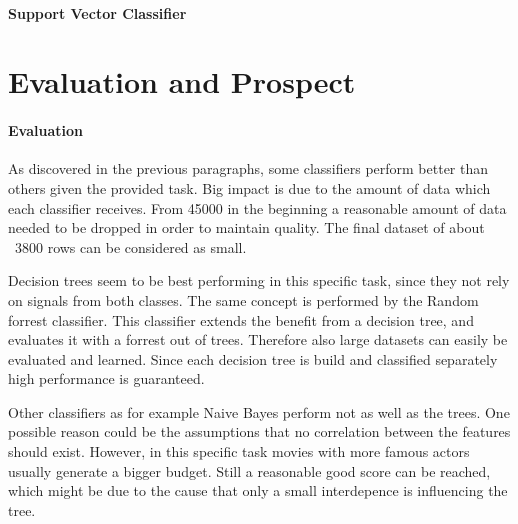 \paragraph{Support Vector Classifier}
\section{Evaluation and Prospect}
\paragraph{Evaluation}
As discovered in the previous paragraphs, some classifiers perform better than others given the provided task. Big impact is due to the amount of data which each classifier receives. From 45000 in the beginning a reasonable amount of data needed to be dropped in order to maintain quality. The final dataset of about ~3800 rows can be considered as small. 

Decision trees seem to be best performing in this specific task, since they not rely on signals from both classes. The same concept is performed by the Random forrest classifier. This classifier extends the benefit from a decision tree, and evaluates it with a forrest out of trees. Therefore also large datasets can easily be evaluated and learned. Since each decision tree is build and classified separately high performance is guaranteed.

Other classifiers as for example Naive Bayes perform not as well as the trees. One possible reason could be the assumptions that no correlation between the features should exist. However, in this specific task movies with more famous actors usually generate a bigger budget. Still a reasonable good score can be reached, which might be due to the cause that only a small interdepence is influencing the tree.



